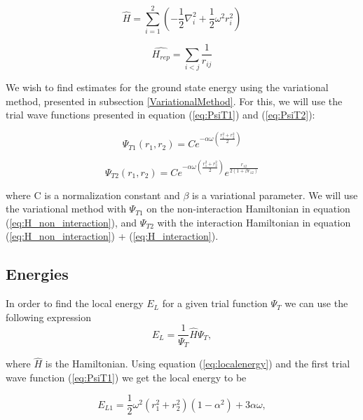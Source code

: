 \documentclass[norsk,a4paper,12pt]{article}
\begin{document}
\begin{equation}
    \hat{H} = \sum_{i=1}^{2} (-\frac{1}{2}\nabla_i^2 + \frac{1}{2} \omega^2r_i^2) 
    \label{eq:H_non_interaction}
\end{equation}

\begin{equation}
    \hat{H_{rep}} = \sum_{i<j} \frac{1}{r_{ij}}
    \label{eq:H_interaction}
\end{equation}

We wish to find estimates for the ground state energy using the variational method, presented in subsection \ref{VariationalMethod}. For this, we will use the trial wave functions presented in equation (\ref{eq:PsiT1}) and (\ref{eq:PsiT2}):

\begin{equation}
    \Psi_{T1} (r_1, r_2) = Ce^{-\alpha \omega (\frac{r_1^2 + r_2^2}{2})}
    \label{eq:PsiT1}
\end{equation}

\begin{equation}
    \Psi_{T2}(r_1, r_2) = Ce^{-\alpha \omega (\frac{r_1^2 + r_2^2}{2})}e^{\frac{r_{12}}{2(1+\beta r_{12})}}
    \label{eq:PsiT2}
\end{equation}

where C is a normalization constant and $\beta$ is a variational parameter. We will use the variational method with $\Psi_{T1}$ on the non-interaction Hamiltonian in equation (\ref{eq:H_non_interaction}), and $\Psi_{T2}$ with the interaction Hamiltonian in equation (\ref{eq:H_non_interaction}) + (\ref{eq:H_interaction}).

\subsection{Energies} \label{Energies}
In order to find the local energy $E_L$ for a given trial function $\Psi_T$ we can use the following expression
\begin{equation}
E_L = \frac{1}{\Psi_T}\hat{H}\Psi_T,
\label{eq:localenergy}
\end{equation}

where $\hat{H}$ is the Hamiltonian. Using equation (\ref{eq:localenergy}) and the first trial wave function (\ref{eq:PsiT1}) we get the local energy to be

\begin{equation}
E_{L1} = \frac{1}{2}\omega^2 (r_1^2 + r_2^2)(1-\alpha^2) + 3\alpha \omega,
\label{eq:EL1}
\end{equation}
\end{document}
